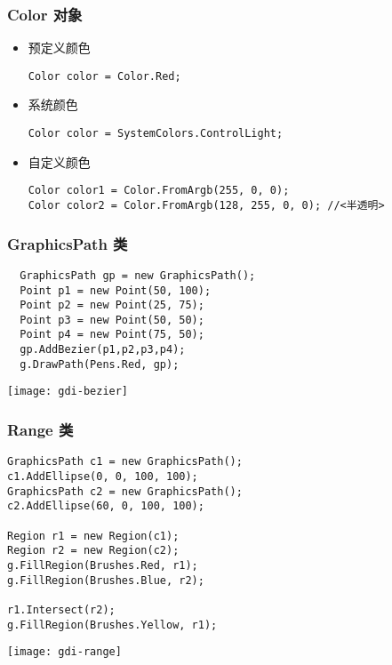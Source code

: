 \begin{frame}[fragile]
\frametitle{Color 对象}
\begin{itemize}
\item 预定义颜色
\begin{lstlisting}
Color color = Color.Red;
\end{lstlisting}
\item 系统颜色
\begin{lstlisting}
Color color = SystemColors.ControlLight;
\end{lstlisting}
\item 自定义颜色
\begin{lstlisting}[escapeinside=<>]
Color color1 = Color.FromArgb(255, 0, 0);
Color color2 = Color.FromArgb(128, 255, 0, 0); //<半透明>
\end{lstlisting}
\end{itemize}
\end{frame}

\begin{frame}[fragile]
\frametitle{GraphicsPath 类}
\begin{lstlisting}
  GraphicsPath gp = new GraphicsPath();
  Point p1 = new Point(50, 100);
  Point p2 = new Point(25, 75);
  Point p3 = new Point(50, 50);
  Point p4 = new Point(75, 50);
  gp.AddBezier(p1,p2,p3,p4);
  g.DrawPath(Pens.Red, gp);
\end{lstlisting}
\texttt{[image: gdi-bezier]}
\end{frame}

\begin{frame}[fragile]
\frametitle{Range 类}
\begin{lstlisting}
GraphicsPath c1 = new GraphicsPath();
c1.AddEllipse(0, 0, 100, 100);
GraphicsPath c2 = new GraphicsPath();
c2.AddEllipse(60, 0, 100, 100);

Region r1 = new Region(c1);
Region r2 = new Region(c2);
g.FillRegion(Brushes.Red, r1);
g.FillRegion(Brushes.Blue, r2);

r1.Intersect(r2);
g.FillRegion(Brushes.Yellow, r1);
\end{lstlisting}
\texttt{[image: gdi-range]}
\end{frame}


